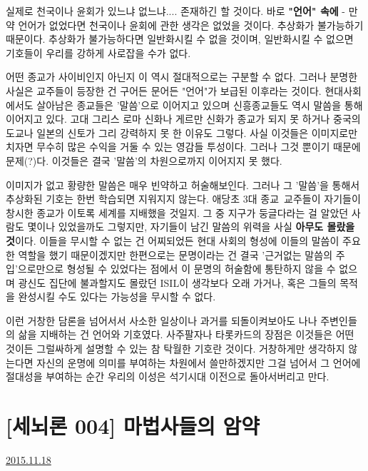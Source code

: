 실제로 천국이나 윤회가 있느냐 없느냐.... 존재하긴 할 것이다. 바로 \textbf{"언어" 속에} -
만약 언어가 없었다면 천국이나 윤회에 관한 생각은 없었을 것이다. 추상화가 불가능하기 때문이다.
추상화가 불가능하다면 일반화시킬 수 없을 것이며, 일반화시킬 수 없으면 기호들이 우리를 강하게 사로잡을 수가 없다.
\vspace{5mm}

어떤 종교가 사이비인지 아닌지 이 역시 절대적으로는 구분할 수 없다.
그러나 분명한 사실은 교주들이 등장한 건 구어든 문어든 "언어"가 보급된 이후라는 것이다.
현대사회에서도 살아남은 종교들은 '말씀'으로 이어지고 있으며 신흥종교들도 역시 말씀을 통해 이어지고 있다.
고대 그리스 로마 신화나 게르만 신화가 종교가 되지 못 하거나 중국의 도교나 일본의 신토가 그리 강력하지 못 한 이유도 그렇다.
사실 이것들은 이미지로만 치자면 무수히 많은 수익을 거둘 수 있는 영감들 투성이다.
그러나 그것 뿐이기 때문에 문제(?)다. 이것들은 결국 '말씀'의 차원으로까지 이어지지 못 했다.
\vspace{5mm}

이미지가 없고 황량한 말씀은 매우 빈약하고 허술해보인다.
그러나 그 '말씀'을 통해서 추상화된 기호는 한번 학습되면 지워지지 않는다.
애당초 3대 종교 교주들이 자기들이 창시한 종교가 이토록 세계를 지배했을 것일지.
그 중 지구가 둥글다라는 걸 알았던 사람도 몇이나 있었을까도 그렇지만, 자기들이 남긴 말씀의 위력을 사실 \textbf{아무도 몰랐을 것}이다.
이들을 무시할 수 없는 건 어찌되었든 현대 사회의 형성에 이들의 말씀이 주요한 역할을 했기 때문이겠지만
한편으로는 문명이라는 건 결국 '근거없는 말씀의 주입'으로만으로 형성될 수 있었다는 점에서 이 문명의 허술함에 통탄하지 않을 수 없으며
광신도 집단에 불과할지도 몰랐던 ISIL이 생각보다 오래 가거나, 혹은 그들의 목적을 완성시킬 수도 있다는 가능성을 무시할 수 없다.
\vspace{5mm}

이런 거창한 담론을 넘어서서 사소한 일상이나 과거를 되돌이켜보아도
나나 주변인들의 삶을 지배하는 건 언어와 기호였다.
사주팔자나 타롯카드의 장점은 이것들은 어떤 것이든 그럴싸하게 설명할 수 있는 참 탁월한 기호란 것이다.
거창하게만 생각하지 않는다면 자신의 운명에 의미를 부여하는 차원에서 쓸만하겠지만
그걸 넘어서 그 언어에 절대성을 부여하는 순간 우리의 이성은 석기시대 이전으로 돌아서버리고 만다.
\vspace{5mm}






\section{[세뇌론 004] 마법사들의 암약}
\href{https://www.kockoc.com/Apoc/499345}{2015.11.18}

